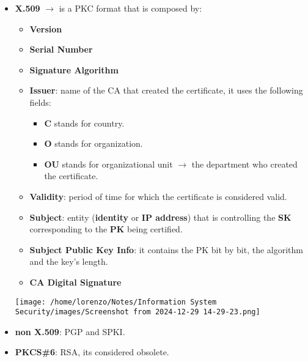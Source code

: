 \begin{itemize}
    \item \textbf{X.509} \(\rightarrow \) is a PKC format that is composed by:
    \\
    \begin{minipage}{0.6\textwidth}
    	\vspace{0.4cm}
    \begin{itemize}
        \item \textbf{Version}
        \item \textbf{Serial Number}
        \item \textbf{Signature Algorithm}
        \item \textbf{Issuer}: name of the CA that created the certificate, it uses the following fields:
        \begin{itemize}
            \item \textbf{C} stands for country.
            \item \textbf{O} stands for organization.
            \item \textbf{OU} stands for organizational unit \(\rightarrow \) the department who created the certificate.
        \end{itemize}
        \item \textbf{Validity}: period of time for which the certificate is considered valid.
        \item \textbf{Subject}:  entity (\textbf{identity} or \textbf{IP address}) that is controlling the \textbf{SK} corresponding
        to the \textbf{PK} being certified.
        \item \textbf{Subject Public Key Info}: it contains the PK bit by bit, the algorithm and the
        key’s length.
        \item \textbf{CA Digital Signature}
    \end{itemize} 
    \end{minipage} 
    \hspace{0cm}
    \begin{minipage}{0.4\textwidth}
        \centering
        \texttt{[image: /home/lorenzo/Notes/Information System Security/images/Screenshot from 2024-12-29 14-29-23.png]}
    \end{minipage}
    \item \textbf{non X.509}: PGP and SPKI.
    \item \textbf{PKCS\#6}: RSA, its considered obsolete.
\end{itemize}

